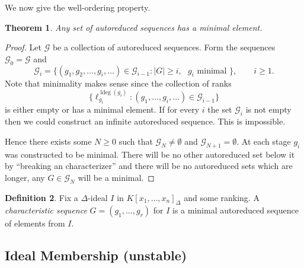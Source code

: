 \documentclass[12pt]{book}
\numberwithin{equation}{section}
\newtheorem{theorem}{Theorem}[subsection]
\theoremstyle{definition}
\newtheorem{definition}[theorem]{Definition}
\theoremstyle{remark}
\newcommand{\ldeg}{\operatorname{ldeg}}
\begin{document}
We now give the well-ordering property.
\begin{theorem}
	Any set of autoreduced sequences has a minimal element.
\end{theorem}
\begin{proof}
	Let $\mathcal{G}$ be a collection of autoreduced sequences. 
	Form the sequences $\mathcal{G}_0 = \mathcal{G}$ and 
	 $$ \mathcal{G}_i = \lbrace (g_1,g_2,\ldots, g_i,\ldots) \in \mathcal{G}_{i-1} \colon \vert G \vert \geq i, \mbox{ $g_i$ minimal } \rbrace, \qquad i \geq 1. $$
	 Note that minimality makes sense since the collection of ranks
	 $$ \lbrace \ell_{g_i}^{\ldeg(g_i)} \colon (g_1,\ldots,g_i,\ldots) \in \mathcal{G}_{i-1} \rbrace $$
	is either empty or has a minimal element.
	If for every $i$ the set $\mathcal{G}_i$ is not empty then we could construct an infinite autoreduced sequence. 
	This is impossible. 
	
	Hence there exists some $N\geq 0$ such that $\mathcal{G}_N \neq \emptyset$ and $\mathcal{G}_{N+1}=\emptyset$. 
	At each stage $g_i$ was constructed to be minimal. 
	There will be no other autoreduced set below it by ``breaking an characterizer'' and there will be no autoreduced sets which are longer, any $G \in \mathcal{G}_N$ will be a minimal.
\end{proof}

\begin{definition}
	Fix a $\Delta$-ideal $I$ in $K[x_1,\ldots,x_n]_{\Delta}$ and some ranking. 
	A \emph{characteristic sequence} $G=(g_1,\ldots,g_r)$ for $I$ is a minimal autoreduced sequence of elements from $I$.
\end{definition}




\subsection{Ideal Membership (unstable)}
\end{document}
